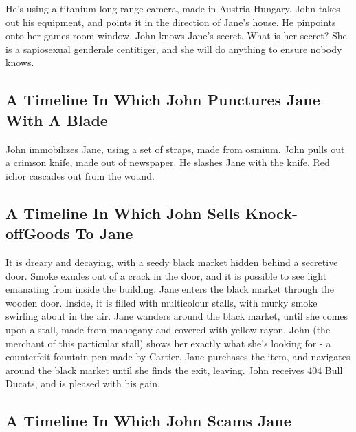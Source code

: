 \documentclass{article}
\begin{document}
He's using a titanium long{-}range camera, made in Austria{-}Hungary.
John takes out his equipment, and points it in the direction of Jane's house. He pinpoints onto her games room window.
John knows Jane's secret. What is her secret? She is a sapiosexual genderale centitiger, and she will do anything to ensure nobody knows.
\subsection{A Timeline In Which John Punctures Jane With A Blade}


John immobilizes Jane, using a set of straps, made from osmium.
John pulls out a crimson knife, made out of newspaper.
He slashes Jane with the knife.
Red ichor cascades out from the wound.
\subsection{A Timeline In Which John Sells Knock{-}offGoods To Jane}


It is dreary and decaying, with a seedy black market hidden behind a secretive door.
Smoke exudes out of a crack in the door, and it is possible to see light emanating from inside the building.
Jane enters the black market through the wooden door.
Inside, it is filled with multicolour stalls, with murky smoke swirling about in the air.
Jane wanders around the black market, until she comes upon a stall, made from mahogany and covered with yellow rayon.
John (the merchant of this particular stall) shows her exactly what she's looking for {-} a counterfeit fountain pen made by Cartier.
Jane purchases the item, and navigates around the black market until she finds the exit, leaving.
John receives 404 Bull Ducats, and is pleased with his gain.
\subsection{A Timeline In Which John Scams Jane}
\end{document}
